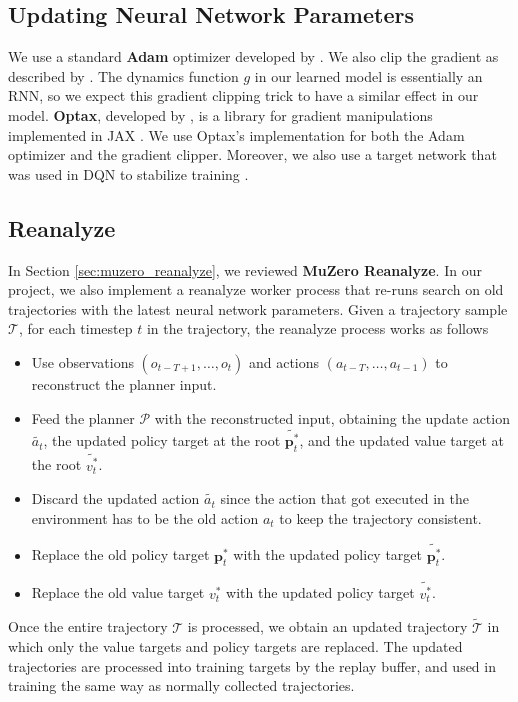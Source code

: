 \subsection{Updating Neural Network Parameters}
We use a standard \textbf{Adam} optimizer developed by \citeauthor{AdamMethodStochastic_Kingma.Ba_2017} \cite{AdamMethodStochastic_Kingma.Ba_2017}.
We also clip the gradient as described by \citeauthor{DifficultyTrainingRecurrent_Pascanu.Mikolov.ea_2013} \cite{DifficultyTrainingRecurrent_Pascanu.Mikolov.ea_2013}.
The dynamics function $g$ in our learned model is essentially an RNN, so we expect this gradient clipping trick to have a similar effect in our model.
\textbf{Optax}, developed by \citeauthor{OptaxComposableGradient_MatteoHessel.DavidBudden.ea_2020}, is a library for gradient manipulations implemented in JAX \cite{OptaxComposableGradient_MatteoHessel.DavidBudden.ea_2020}.
We use Optax's implementation for both the Adam optimizer and the gradient clipper.
Moreover, we also use a target network that was used in DQN to stabilize training \cite{PlayingAtariDeep_Mnih.Kavukcuoglu.ea_2013}.

\subsection{\moozi Reanalyze} \label{sec:reanalyze}
In Section \ref{sec:muzero_reanalyze}, we reviewed \textbf{MuZero Reanalyze}.
In our project, we also implement a reanalyze worker process that re-runs search on old trajectories with the latest neural network parameters.
Given a trajectory sample $\mathcal{T}$, for each timestep $t$ in the trajectory, the reanalyze process works as follows
\begin{itemize}
    \item Use observations $(o_{t - T + 1}, \dots, o_{t})$ and actions $(a_{t - T}, \dots, a_{t - 1})$ to reconstruct the planner input.
    \item Feed the planner $\mathcal{P}$ with the reconstructed input, obtaining the update action $\tilde{a_t}$, the updated policy target at the root $\tilde{\mathbf{p}^*_t}$, and the updated value target at the root $\tilde{v^*_t}$.
    \item Discard the updated action $\tilde{a_t}$ since the action that got executed in the environment has to be the old action $a_t$ to keep the trajectory consistent.
    \item Replace the old policy target $\mathbf{p}^*_t$ with the updated policy target $\tilde{\mathbf{p}^*_t}$.
    \item Replace the old value target $v^*_t$ with the updated policy target $\tilde{v^*_t}$.
\end{itemize}
Once the entire trajectory $\mathcal{T}$ is processed, we obtain an updated trajectory $\tilde{\mathcal{T}}$ in which only the value targets and policy targets are replaced.
The updated trajectories are processed into training targets by the replay buffer, and used in training the same way as normally collected trajectories.

